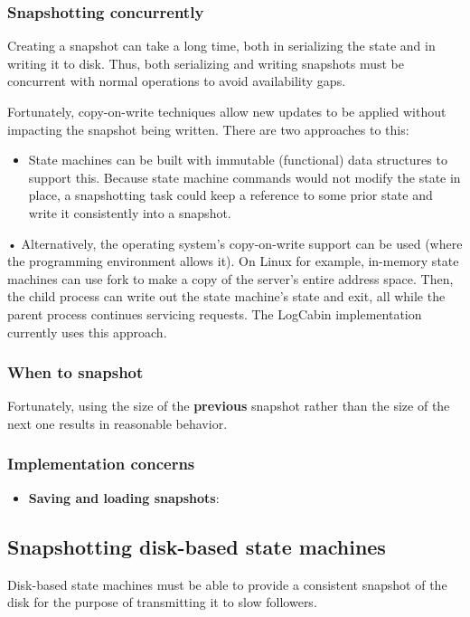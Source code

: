 \documentclass[11pt]{article}
\begin{document}
\subsubsection{Snapshotting concurrently}
\label{sec:orgbb45437}
Creating a snapshot can take a long time, both in serializing the state and in writing it to disk.
Thus, both serializing and writing snapshots must be concurrent with normal operations to avoid
availability gaps.

Fortunately, copy-on-write techniques allow new updates to be applied without impacting the snapshot
being written. There are two approaches to this:
\begin{itemize}
\item State machines can be built with immutable (functional) data structures to support this. Because
state machine commands would not modify the state in place, a snapshotting task could keep a
reference to some prior state and write it consistently into a snapshot.
\end{itemize}
• Alternatively, the operating system’s copy-on-write support can be used (where the programming
environment allows it). On Linux for example, in-memory state machines can use fork to make a copy of
the server’s entire address space. Then, the child process can write out the state machine’s state and
exit, all while the parent process continues servicing requests. The LogCabin implementation currently
uses this approach.
\subsubsection{When to snapshot}
\label{sec:org36a2554}
Fortunately, using the size of the \textbf{previous} snapshot rather than the size of the next one results in reasonable behavior.
\subsubsection{Implementation concerns}
\label{sec:org7846f9b}
\begin{itemize}
\item \textbf{Saving and loading snapshots}:
\end{itemize}
\subsection{Snapshotting disk-based state machines}
\label{sec:org7f16a3e}
Disk-based state machines must be able to provide a consistent snapshot of the disk for the purpose of
transmitting it to slow followers.
\end{document}
